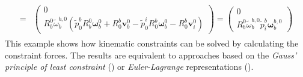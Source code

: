 \documentclass[a4paper,twoside, openright,12pt]{report}
\newcommand{\f}[1]{\boldsymbol{#1}}
\begin{document}
{\begin{eqnarray}
\begin{aligned}
=&
\begin{pmatrix}
0 \\ R_b^0\tilde{\omega}_b^{b,0}
(\tilde{p}_0^b R_b^0 \boldsymbol{\omega}_b^0 + R_0^b \f{v}_b^0 - \tilde{p}_0^i R_0^b \boldsymbol{\omega}_b^0 - R_0^b \f{v}_i^0)
\end{pmatrix} 
=
\begin{pmatrix}0 \\
R_b^0\tilde{\omega}_b^{b,0}
\tilde{p}_i^b \boldsymbol{\omega}_b^{b,0}
\end{pmatrix} 
\end{aligned}
\end{eqnarray}
This example shows how kinematic constraints can be solved by calculating the constraint forces. The results are equivalent to approaches based on the \emph{Gauss' principle of least constraint} (\cite{Erhart_16}) or \emph{Euler-Lagrange} representations (\cite{Liu_02}).\\


}
\end{document}
